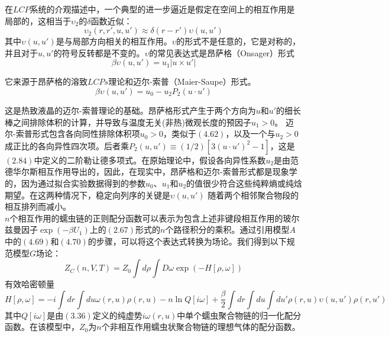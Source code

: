 在$LCP$系统的介观描述中，一个典型的进一步逼近是假定在空间上的相互作用是局部的，这相当于$\upsilon_2$的$\delta$函数近似：\\
\begin{equation}
\upsilon_{2}(r,r',u,u') \approx \delta(r-r') \upsilon(u,u')
\end{equation}
其中$\upsilon(u,u')$是与局部方向相关的相互作用。$\upsilon$的形式不是任意的，它是对称的，并且对于$u,u'$的符号反转都是不变的。$\upsilon$的常见表达式是昂萨格（Onsager）形式\\
\begin{equation}
\beta \upsilon(u,u')= u_{1}|u\times u'|
\end{equation}

它来源于昂萨格的溶致$LCPs$理论和迈尔-索普（Maier-Saupe）形式。\\
\begin{equation}
\beta \upsilon(u,u')=u_0 - u_{2} P_{2}(u \cdot u')
\end{equation}

这是热致液晶的迈尔-索普理论的基础。昂萨格形式产生于两个方向为$u$和$u'$的细长棒之间排除体积的计算，并导致与温度无关(非热)微观长度的预因子$u_{1}>0$。 迈尔-索普形式包含各向同性排除体积项$u_{0}>0$，类似于$(4.62)$，以及一个与$u_2>0$成正比的各向异性四次项。后者乘$P_{2}(u,u')\equiv (1/2)[3(u\cdot u')^2-1]$，这是$(2.84)$中定义的二阶勒让德多项式。在原始理论中，假设各向异性系数$u_2$是由范德华尔斯相互作用导出的，因此，在现实中，昂萨格和迈尔-索普形式都是现象学的，因为通过拟合实验数据得到的参数$u_0$、$u_1$和$u_2$的值很少符合这些纯粹熵或纯焓期望。在这两种情况下，稳定向列序的关键是$\upsilon (u,u')$ 随着两个相邻聚合物段的相互排列而减小。\\

$n$个相互作用的蠕虫链的正则配分函数可以表示为包含上述非键段相互作用的玻尔兹曼因子$\exp (-\beta U_1)$上的$(2.67)$形式的$n$个路径积分的乘积。通过引用模型$A$中的$(4.69)$和$(4.70)$的步骤，可以将这个表达式转换为场论。我们得到以下规范模型$G$场论：\\
\begin{equation}
Z_{C}(n,V,T)=Z_{0} \int d \rho \int D \omega \exp (-H[\rho,\omega])
\end{equation}
有效哈密顿量\\ 
\begin{equation}
H[\rho,\omega]= -i \int dr \int du \omega(r,u) \rho(r,u)-n \ln Q[i \omega]+\frac{\beta}{2} \int dr \int du \int du' \rho(r,u) \upsilon(u,u') \rho(r,u')
\end{equation}
其中$Q[i \omega]$是由$(3.36)$定义的纯虚势$i \omega(r,u)$中单个蠕虫聚合物链的归一化配分函数。在该模型中，$Z_0$为$n$个非相互作用蠕虫状聚合物链的理想气体的配分函数。\\

